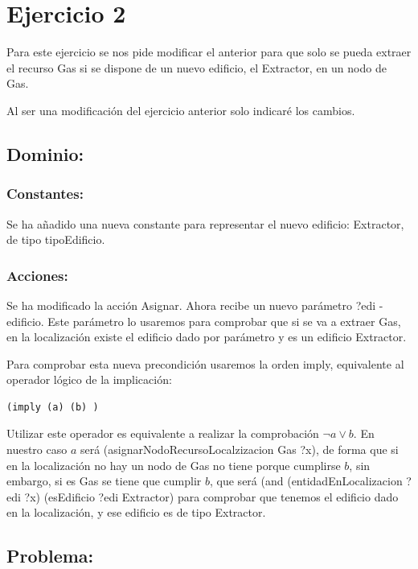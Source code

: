 \documentclass[10pt, spanish]{article}
\begin{document}
\section{Ejercicio 2}

Para este ejercicio se nos pide modificar el anterior para que solo se pueda extraer el recurso Gas si se dispone de un nuevo edificio, el Extractor, en un nodo de Gas.

Al ser una modificación del ejercicio anterior solo indicaré los cambios.

\subsection{Dominio:}

\subsubsection{Constantes:}

Se ha añadido una nueva constante para representar el nuevo edificio: Extractor, de tipo tipoEdificio.

\subsubsection{Acciones:}

Se ha modificado la acción Asignar. Ahora recibe un nuevo parámetro ?edi - edificio. Este parámetro lo usaremos para comprobar que si se va a extraer Gas, en la localización existe el edificio dado por parámetro y es un edificio Extractor.

Para comprobar esta nueva precondición usaremos la orden imply, equivalente al operador lógico de la implicación:

\begin{lstlisting}
(imply (a) (b) )
\end{lstlisting}

Utilizar este operador es equivalente a realizar la comprobación $\neg a \lor b$. En nuestro caso $a$ será  (asignarNodoRecursoLocalzizacion Gas ?x), de forma que si en la localización no hay un nodo de Gas no tiene porque cumplirse $b$, sin embargo, si es Gas se tiene que cumplir $b$, que será (and (entidadEnLocalizacion ?edi ?x) (esEdificio ?edi Extractor) para comprobar que tenemos el edificio dado en la localización, y ese edificio es de tipo Extractor.

\subsection{Problema:}
\end{document}
